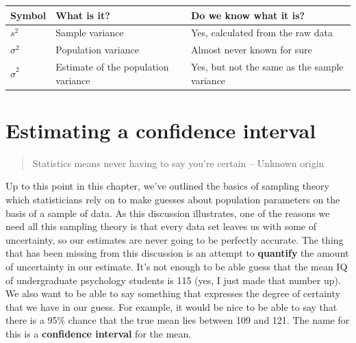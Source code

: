 \documentclass[
]{book}
\begin{document}
\begin{longtable}[]{@{}
  >{\raggedright\arraybackslash}p{}
  >{\raggedright\arraybackslash}p{}
  >{\raggedright\arraybackslash}p{}@{}}
\toprule\noalign{}
\begin{minipage}[b]{\linewidth}\raggedright
Symbol
\end{minipage} & \begin{minipage}[b]{\linewidth}\raggedright
What is it?
\end{minipage} & \begin{minipage}[b]{\linewidth}\raggedright
Do we know what it is?
\end{minipage} \\
\midrule\noalign{}
\endhead
\bottomrule\noalign{}
\endlastfoot
\(s^2\) & Sample variance & Yes, calculated from the raw data \\
\(\sigma^2\) & Population variance & Almost never known for sure \\
\(\hat{\sigma}^2\) & Estimate of the population variance & Yes, but not the same as the sample variance \\
\end{longtable}

\section{Estimating a confidence interval}\label{estimating-a-confidence-interval}

\begin{quote}
Statistics means never having to say you're certain -- Unknown origin
\end{quote}

Up to this point in this chapter, we've outlined the basics of sampling theory which statisticians rely on to make guesses about population parameters on the basis of a sample of data. As this discussion illustrates, one of the reasons we need all this sampling theory is that every data set leaves us with some of uncertainty, so our estimates are never going to be perfectly accurate. The thing that has been missing from this discussion is an attempt to \textbf{quantify} the amount of uncertainty in our estimate. It's not enough to be able guess that the mean IQ of undergraduate psychology students is 115 (yes, I just made that number up). We also want to be able to say something that expresses the degree of certainty that we have in our guess. For example, it would be nice to be able to say that there is a 95\% chance that the true mean lies between 109 and 121. The name for this is a \textbf{confidence interval} for the mean.
\end{document}
